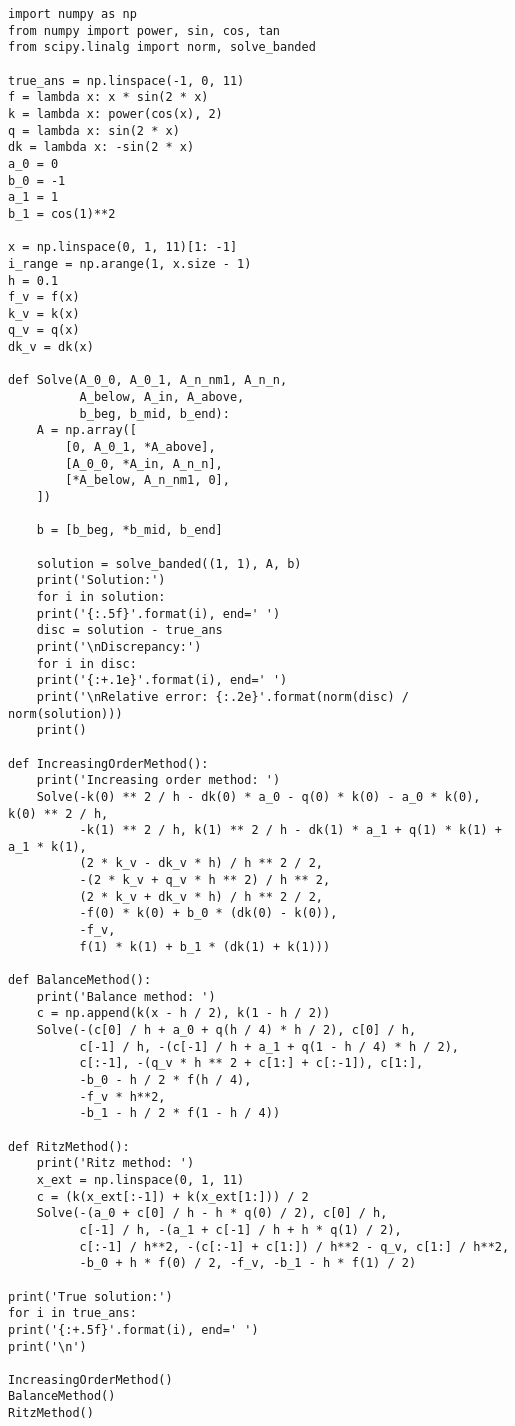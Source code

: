 \documentclass[a4paper]{article}
\begin{document}
	\begin{verbatim}
import numpy as np
from numpy import power, sin, cos, tan
from scipy.linalg import norm, solve_banded

true_ans = np.linspace(-1, 0, 11)
f = lambda x: x * sin(2 * x)
k = lambda x: power(cos(x), 2)
q = lambda x: sin(2 * x)
dk = lambda x: -sin(2 * x)
a_0 = 0
b_0 = -1
a_1 = 1
b_1 = cos(1)**2

x = np.linspace(0, 1, 11)[1: -1]
i_range = np.arange(1, x.size - 1)
h = 0.1
f_v = f(x)
k_v = k(x)
q_v = q(x)
dk_v = dk(x)

def Solve(A_0_0, A_0_1, A_n_nm1, A_n_n,
          A_below, A_in, A_above,
          b_beg, b_mid, b_end):
	A = np.array([
		[0, A_0_1, *A_above],
		[A_0_0, *A_in, A_n_n],
		[*A_below, A_n_nm1, 0],
	])
	
	b = [b_beg, *b_mid, b_end]
	
	solution = solve_banded((1, 1), A, b)
	print('Solution:')
	for i in solution:
	print('{:.5f}'.format(i), end=' ')
	disc = solution - true_ans
	print('\nDiscrepancy:')
	for i in disc:
	print('{:+.1e}'.format(i), end=' ')
	print('\nRelative error: {:.2e}'.format(norm(disc) / norm(solution)))
	print()

def IncreasingOrderMethod():
	print('Increasing order method: ')
	Solve(-k(0) ** 2 / h - dk(0) * a_0 - q(0) * k(0) - a_0 * k(0), k(0) ** 2 / h,
	      -k(1) ** 2 / h, k(1) ** 2 / h - dk(1) * a_1 + q(1) * k(1) + a_1 * k(1),
	      (2 * k_v - dk_v * h) / h ** 2 / 2,
	      -(2 * k_v + q_v * h ** 2) / h ** 2,
	      (2 * k_v + dk_v * h) / h ** 2 / 2,
	      -f(0) * k(0) + b_0 * (dk(0) - k(0)),
	      -f_v,
	      f(1) * k(1) + b_1 * (dk(1) + k(1)))

def BalanceMethod():
	print('Balance method: ')
	c = np.append(k(x - h / 2), k(1 - h / 2))
	Solve(-(c[0] / h + a_0 + q(h / 4) * h / 2), c[0] / h,
	      c[-1] / h, -(c[-1] / h + a_1 + q(1 - h / 4) * h / 2),
	      c[:-1], -(q_v * h ** 2 + c[1:] + c[:-1]), c[1:],
	      -b_0 - h / 2 * f(h / 4),
	      -f_v * h**2,
	      -b_1 - h / 2 * f(1 - h / 4))

def RitzMethod():
	print('Ritz method: ')
	x_ext = np.linspace(0, 1, 11)
	c = (k(x_ext[:-1]) + k(x_ext[1:])) / 2
	Solve(-(a_0 + c[0] / h - h * q(0) / 2), c[0] / h,
	      c[-1] / h, -(a_1 + c[-1] / h + h * q(1) / 2),
          c[:-1] / h**2, -(c[:-1] + c[1:]) / h**2 - q_v, c[1:] / h**2,
	      -b_0 + h * f(0) / 2, -f_v, -b_1 - h * f(1) / 2)

print('True solution:')
for i in true_ans:
print('{:+.5f}'.format(i), end=' ')
print('\n')

IncreasingOrderMethod()
BalanceMethod()
RitzMethod()
	
	\end{verbatim}
	
\end{document}
